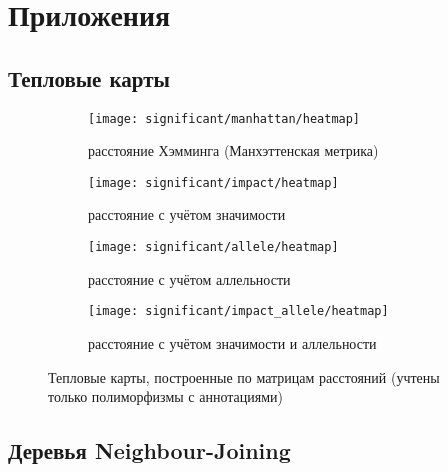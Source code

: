 \documentclass[main.tex]{subfiles}
\begin{document}
\newpage
\section{Приложения}\label{appendix}

\subsection{Тепловые карты}

\begin{figure}[H]
    \centering
    \begin{subfigure}{.5\textwidth}
        \centering
        \texttt{[image: significant/manhattan/heatmap]}
        \captionsetup{width=.8\linewidth}
        \caption{расстояние Хэмминга (Манхэттенская метрика)}
        \label{fig:heatmap_manh}
    \end{subfigure}%
    \begin{subfigure}{.5\textwidth}
        \centering
        \texttt{[image: significant/impact/heatmap]}
        \captionsetup{width=.8\linewidth}
        \caption{расстояние с учётом значимости}
        \label{fig:heatmap_impact}
    \end{subfigure}

    \begin{subfigure}{.5\textwidth}
        \centering
        \texttt{[image: significant/allele/heatmap]}
        \captionsetup{width=.8\linewidth}
        \caption{расстояние с учётом аллельности}
        \label{fig:heatmap_allele}
    \end{subfigure}%
    \begin{subfigure}{.5\textwidth}
        \centering
        \texttt{[image: significant/impact\_allele/heatmap]}
        \captionsetup{width=.8\linewidth}
        \caption{расстояние с учётом значимости и аллельности}
        \label{fig:heatmap_impact_allele}
    \end{subfigure}
    \caption{Тепловые карты, построенные по матрицам расстояний (учтены только полиморфизмы с аннотациями)}
\end{figure}

\subsection{Деревья Neighbour-Joining}
\end{document}
